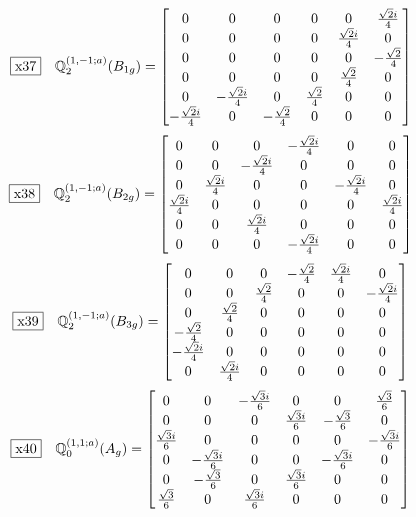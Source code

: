 \documentclass[fleqn,10pt,landscape]{jsarticle}
\begin{document}
\begin{dmath*}
\fbox{x37}\quad \mathbb{Q}_{2}^{(1,-1;a)}(B_{1g})=\begin{bmatrix} 0 & 0 & 0 & 0 & 0 & \frac{\sqrt{2} i}{4} \\ 0 & 0 & 0 & 0 & \frac{\sqrt{2} i}{4} & 0 \\ 0 & 0 & 0 & 0 & 0 & - \frac{\sqrt{2}}{4} \\ 0 & 0 & 0 & 0 & \frac{\sqrt{2}}{4} & 0 \\ 0 & - \frac{\sqrt{2} i}{4} & 0 & \frac{\sqrt{2}}{4} & 0 & 0 \\ - \frac{\sqrt{2} i}{4} & 0 & - \frac{\sqrt{2}}{4} & 0 & 0 & 0 \end{bmatrix}
\end{dmath*}
\begin{dmath*}
\fbox{x38}\quad \mathbb{Q}_{2}^{(1,-1;a)}(B_{2g})=\begin{bmatrix} 0 & 0 & 0 & - \frac{\sqrt{2} i}{4} & 0 & 0 \\ 0 & 0 & - \frac{\sqrt{2} i}{4} & 0 & 0 & 0 \\ 0 & \frac{\sqrt{2} i}{4} & 0 & 0 & - \frac{\sqrt{2} i}{4} & 0 \\ \frac{\sqrt{2} i}{4} & 0 & 0 & 0 & 0 & \frac{\sqrt{2} i}{4} \\ 0 & 0 & \frac{\sqrt{2} i}{4} & 0 & 0 & 0 \\ 0 & 0 & 0 & - \frac{\sqrt{2} i}{4} & 0 & 0 \end{bmatrix}
\end{dmath*}
\begin{dmath*}
\fbox{x39}\quad \mathbb{Q}_{2}^{(1,-1;a)}(B_{3g})=\begin{bmatrix} 0 & 0 & 0 & - \frac{\sqrt{2}}{4} & \frac{\sqrt{2} i}{4} & 0 \\ 0 & 0 & \frac{\sqrt{2}}{4} & 0 & 0 & - \frac{\sqrt{2} i}{4} \\ 0 & \frac{\sqrt{2}}{4} & 0 & 0 & 0 & 0 \\ - \frac{\sqrt{2}}{4} & 0 & 0 & 0 & 0 & 0 \\ - \frac{\sqrt{2} i}{4} & 0 & 0 & 0 & 0 & 0 \\ 0 & \frac{\sqrt{2} i}{4} & 0 & 0 & 0 & 0 \end{bmatrix}
\end{dmath*}
\begin{dmath*}
\fbox{x40}\quad \mathbb{Q}_{0}^{(1,1;a)}(A_{g})=\begin{bmatrix} 0 & 0 & - \frac{\sqrt{3} i}{6} & 0 & 0 & \frac{\sqrt{3}}{6} \\ 0 & 0 & 0 & \frac{\sqrt{3} i}{6} & - \frac{\sqrt{3}}{6} & 0 \\ \frac{\sqrt{3} i}{6} & 0 & 0 & 0 & 0 & - \frac{\sqrt{3} i}{6} \\ 0 & - \frac{\sqrt{3} i}{6} & 0 & 0 & - \frac{\sqrt{3} i}{6} & 0 \\ 0 & - \frac{\sqrt{3}}{6} & 0 & \frac{\sqrt{3} i}{6} & 0 & 0 \\ \frac{\sqrt{3}}{6} & 0 & \frac{\sqrt{3} i}{6} & 0 & 0 & 0 \end{bmatrix}
\end{dmath*}
\end{document}
